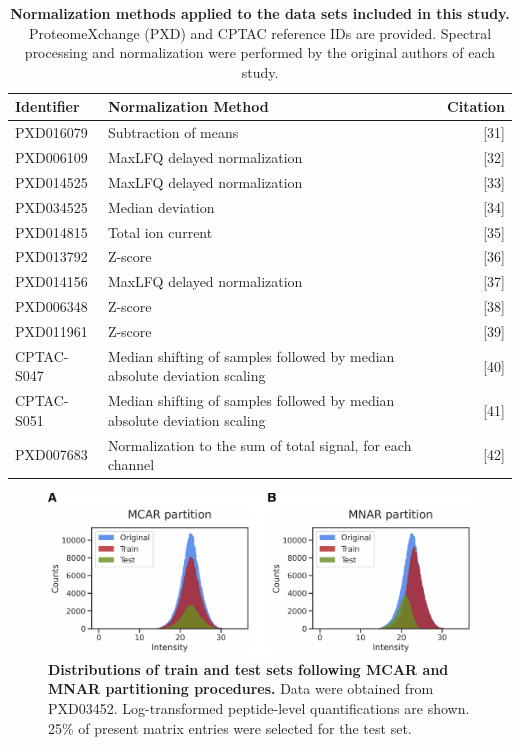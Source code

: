 \documentclass{article}
\begin{document}
\begin{table}
  \centering
  \begin{tabular}{llr}
    \hline
    Identifier & Normalization Method & Citation \\
    \hline
    PXD016079 & Subtraction of means & [31] \\
    PXD006109 & MaxLFQ delayed normalization & [32] \\
    PXD014525 & MaxLFQ delayed normalization & [33] \\
    PXD034525 & Median deviation & [34] \\
    PXD014815 & Total ion current & [35] \\
    PXD013792 & Z-score & [36] \\
    PXD014156 & MaxLFQ delayed normalization & [37] \\
    PXD006348 & Z-score & [38] \\
    PXD011961 & Z-score & [39] \\
    CPTAC-S047 & Median shifting of samples followed by median absolute deviation scaling & [40] \\
    CPTAC-S051 & Median shifting of samples followed by median absolute deviation scaling & [41] \\
    PXD007683 & Normalization to the sum of total signal, for each channel & [42] \\
    \hline
  \end{tabular}
  \caption{{\bf Normalization methods applied to the data sets included in this study.} ProteomeXchange (PXD) and CPTAC reference IDs are provided. Spectral processing and normalization were performed by the original authors of each study.}
    \label{tab:normalization-methods}
\end{table}

\begin{figure}
  \centering
  \includegraphics[width=1.0\textwidth]{figures/partition-distributions-figure.pdf}
  \caption{{\bf Distributions of train and test sets following MCAR and MNAR partitioning procedures.} Data were obtained from PXD03452. Log-transformed peptide-level quantifications are shown. 25\% of present matrix entries were selected for the test set.}
  \label{fig:partitions}
\end{figure} 
\end{document}
